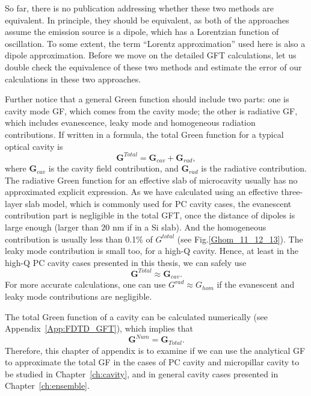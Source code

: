 So far, there is no publication addressing whether these two methods are equivalent. In principle, they should be equivalent, as both of the approaches assume the emission source is a dipole, which has a Lorentzian function of oscillation. To some extent, the term ``Lorentz approximation'' used here is also a dipole approximation. Before we move on the detailed GFT calculations, let us double check the equivalence of these two methods and estimate the error of our calculations in these two approaches.



Further notice that a general Green function should include two parts: one is cavity mode GF, which comes from the cavity mode; the other is radiative GF, which includes evanescence, leaky mode and homogeneous radiation contributions. If written in a formula, the total Green function for a typical optical cavity is
\begin{equation}
 \label{Ganal}
\mathbf{G}^{Total}=\mathbf{G}_{cav}+\mathbf{G}_{rad},
\end{equation}
where $\mathbf{G}_{cav}$ is the cavity field contribution, and $\mathbf{G}_{rad}$ is the radiative contribution. The radiative Green function for an effective slab of microcavity usually has no approximated explicit expression.
As we have calculated using an effective three-layer slab model, which is commonly used for PC cavity cases, the evanescent contribution part is negligible in the total GFT, once the distance of dipoles is large enough (larger than $20$ nm if in a Si slab). And the homogeneous contribution is usually less than 0.1\% of $G^{total}$ (see Fig.\ref{Ghom_11_12_13}). The leaky mode contribution is small too, for a high-Q cavity. Hence, at least in the high-Q PC cavity cases presented in this thesis, we can safely use
\begin{equation}
 \label{GanalandGcav}
\mathbf{G}^{Total} \approx \mathbf{G}_{cav}.
\end{equation}
For more accurate calculations, one can use $G^{rad} \approx G_{hom}$ if the evanescent and leaky mode contributions are negligible.

The total Green function of a cavity can be calculated numerically (see Appendix~\ref{App:FDTD_GFT}), which implies that
\begin{equation}
\mathbf{G}^{Num} = \mathbf{G}_{Total}.
\end{equation}
Therefore, this chapter of appendix is to examine if we can use the analytical GF to approximate the total GF in the cases of PC cavity and micropillar cavity to be studied in Chapter~\ref{ch:cavity}, and in general cavity cases presented in Chapter~\ref{ch:ensemble}.

